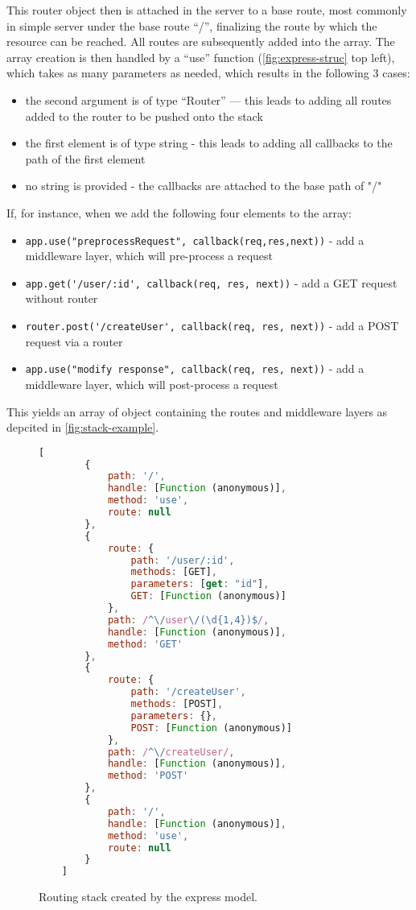 This router object then is attached in the server to a base route, most commonly in  simple server under the base route “/”, finalizing the route by which the resource can be reached. All routes are subsequently added into the array. The array creation is then handled by a “use” function (\autoref{fig:express-struc} top left), which takes as many parameters as needed, which results in the following 3 cases:
\begin{itemize}
    \item  the second argument is of type “Router” — this leads to adding all routes added to the router to be pushed onto the stack
    \item  the first element is of type string - this leads to adding all callbacks to the path of the first element
    \item  no string is provided - the callbacks are attached to the base path of "/"
\end{itemize}
If, for instance, when we add the following four elements to the array:    
\begin{itemize}
    \item \lstinline{app.use("preprocessRequest", callback(req,res,next))} - add a middleware layer, which will pre-process a request
    \item \lstinline{app.get('/user/:id', callback(req, res, next))} - add a GET request without router
    \item \lstinline{router.post('/createUser', callback(req, res, next))} - add a POST request via a router
    \item \lstinline{app.use("modify response", callback(req, res, next))} - add a middleware layer, which will post-process a request
\end{itemize}
This yields an array of object containing the routes and middleware layers as depcited in \autoref{fig:stack-example}.
\begin{figure}[ht]
	\begin{lstlisting}[language=JavaScript, gobble=4]
    [
        {
            path: '/',
            handle: [Function (anonymous)],
            method: 'use',
            route: null
        },
        {
            route: {
                path: '/user/:id',
                methods: [GET],
                parameters: [get: "id"],
                GET: [Function (anonymous)]
            },
            path: /^\/user\/(\d{1,4})$/,
            handle: [Function (anonymous)],
            method: 'GET'
        },
        {
            route: {
                path: '/createUser',
                methods: [POST],
                parameters: {},
                POST: [Function (anonymous)]
            },
            path: /^\/createUser/,
            handle: [Function (anonymous)],
            method: 'POST'
        },
        {
            path: '/',
            handle: [Function (anonymous)],
            method: 'use',
            route: null
        }
    ]
	\end{lstlisting}
	\caption{Routing stack created by the express model. }
	\label{fig:stack-example}
\end{figure}



